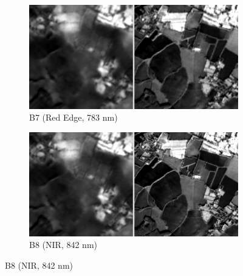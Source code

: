 \begin{figure}[p]
    \ContinuedFloat
    \centering
    \captionsetup[subfigure]{labelformat=empty}

    \begin{subfigure}{0.48\textwidth}
        \centering
        \includegraphics[width=\linewidth]{img/bands_gray/sample_000008_B07_panel.png}
        \caption{B7 (Red Edge, 783 nm)}
    \end{subfigure}\hfill
    \begin{subfigure}{0.48\textwidth}
        \centering
        \includegraphics[width=\linewidth]{img/bands_gray/sample_000008_B08_panel.png}
        \caption{B8 (NIR, 842 nm)}
    \end{subfigure}


\end{figure}
